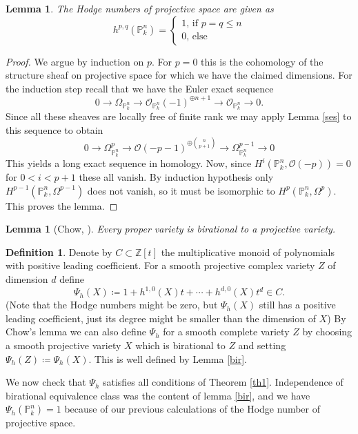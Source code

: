 \documentclass[11pt, a4paper, german, twoside]{article}
\theoremstyle{plain}
\newtheorem{lemma}[theorem]{Lemma}
\theoremstyle{definition}
\newtheorem{definition}[theorem]{Definition}
\begin{document}
\begin{lemma}
    The Hodge numbers of projective space are given as
    \[
        h^{p,q}(\mathbb{P}_k^n) = 
        \begin{cases}
            1 \text{, if $p = q \leq n$}\\
            0 \text{, else}
        \end{cases}
    \]
\end{lemma}
\begin{proof}
    We argue by induction on $p$. 
    For $p = 0$ this is the cohomology of the structure sheaf on projective space for which we have the claimed dimensions.
    For the induction step recall that we have the Euler exact sequence 
    \[0 \to \Omega_{\mathbb{P}_k^n} \to {\mathcal{O}_{\mathbb{P}_k^n}(-1)}^{\oplus n+1} \to \mathcal{O}_{\mathbb{P}_k^n} \to 0 .\]
    Since all these sheaves are locally free of finite rank we may apply Lemma \ref{ses} to this sequence to obtain
    \[
        0 \to \Omega_{\mathbb{P}_k^n}^p \to {\mathcal{O}(-p-1)}^{\oplus \binom{n}{p+1}} \to \Omega_{\mathbb{P}_k^n}^{p-1} \to 0
    \]
    This yields a long exact sequence in homology. Now, since $H^i(\mathbb{P}_k^n, \mathcal{O}(-p)) = 0$ for $0 < i < p+1$ these all vanish.
    By induction hypothesis only $H^{p-1}(\mathbb{P}_k^n, \Omega^{p-1})$ does not vanish, so it must be isomorphic to 
    $H^{p}(\mathbb{P}_k^n, \Omega^p)$. This proves the lemma.
\end{proof}
\begin{lemma}[Chow, {\cite[II Ex. 4.10]{Ha}}]
    Every proper variety is birational to a projective variety.
\end{lemma}


\begin{definition}
    Denote by $C \subset \mathbb{Z}[t]$ the multiplicative monoid of polynomials with positive leading coefficient.
    For a smooth projective complex variety $Z$ of dimension $d$ define
    \[
        \Psi_h(X) \coloneqq1 + h^{1,0}(X)t + \cdots + h^{d,0}(X)t^d \in C.
    \]
    (Note that the Hodge numbers might be zero, but $\Psi_h(X)$ still has a positive leading coefficient, 
    just its degree might be smaller than the dimension of $X$)
    By Chow's lemma we can also define $\Psi_h$ for a smooth complete variety $Z$ by choosing a smooth projective variety $X$ which is birational
    to $Z$ and setting $\Psi_h(Z) \coloneqq \Psi_h(X)$. This is well defined by Lemma \ref{bir}.
\end{definition}

We now check that $\Psi_h$ satisfies all conditions of Theorem \ref{th1}. Independence of birational equivalence class was the content of lemma
\ref{bir}, and we have $\Psi_h(\mathbb{P}_k^n) = 1$ because of our previous calculations of the Hodge number of projective space.
\end{document}
